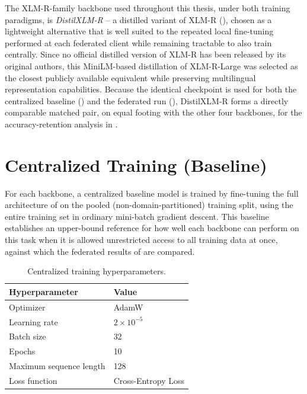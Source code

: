 The XLM-R-family backbone used throughout this thesis, under both training paradigms, is \emph{DistilXLM-R} -- a distilled variant of XLM-R (), chosen as a lightweight alternative that is well suited to the repeated local fine-tuning performed at each federated client while remaining tractable to also train centrally. Since no official distilled version of XLM-R has been released by its original authors, this MiniLM-based distillation of XLM-R-Large was selected as the closest publicly available equivalent while preserving multilingual representation capabilities. Because the identical checkpoint is used for both the centralized baseline () and the federated run (), DistilXLM-R forms a directly comparable matched pair, on equal footing with the other four backbones, for the accuracy-retention analysis in .

\section{Centralized Training (Baseline)}
\label{sec:centralized}

For each backbone, a centralized baseline model is trained by fine-tuning the full architecture of  on the pooled (non-domain-partitioned) training split, using the entire training set in ordinary mini-batch gradient descent. This baseline establishes an upper-bound reference for how well each backbone can perform on this task when it is allowed unrestricted access to all training data at once, against which the federated results of  are compared.

\begin{table}[htbp]
\centering
\caption{Centralized training hyperparameters.}
\label{tab:central-hparams}
\begin{tabular}{@{}ll@{}}
\toprule
\textbf{Hyperparameter} & \textbf{Value} \\
\midrule
Optimizer & AdamW \\
Learning rate & $2 \times 10^{-5}$ \\
Batch size & 32 \\
Epochs & 10 \\
Maximum sequence length & 128 \\
Loss function & Cross-Entropy Loss \\
\bottomrule
\end{tabular}
\end{table}

